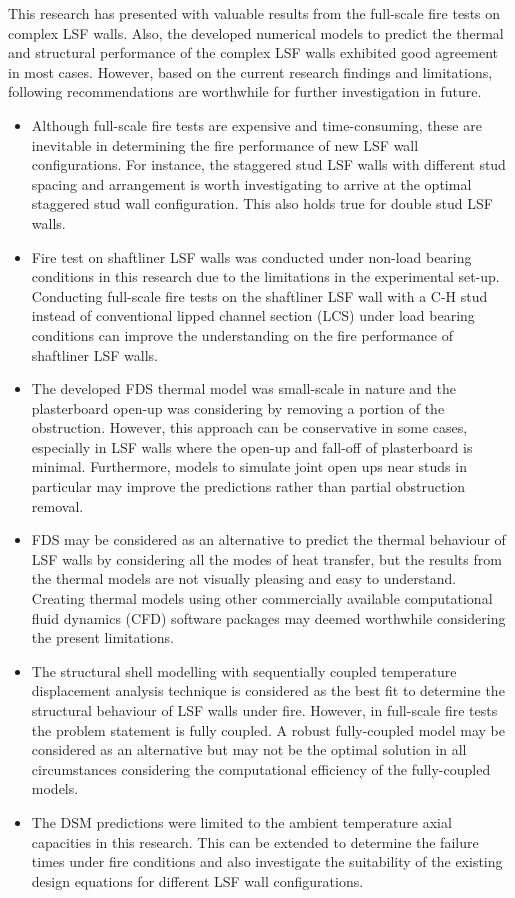 This research has presented with valuable results from the full-scale fire tests on complex LSF walls. Also, the developed numerical models to predict the thermal and structural performance of the complex LSF walls exhibited good agreement in most cases. However, based on the current research findings and limitations, following recommendations are worthwhile for further investigation in future. 
\begin{itemize}
	\item Although full-scale fire tests are expensive and time-consuming, these are inevitable in determining the fire performance of new LSF wall configurations. For instance, the staggered stud LSF walls with different stud spacing and arrangement is worth investigating to arrive at the optimal staggered stud wall configuration. This also holds true for double stud LSF walls.
	\item Fire test on shaftliner LSF walls was conducted under non-load bearing conditions in this research due to the limitations in the experimental set-up. Conducting full-scale fire tests on the shaftliner LSF wall with a C-H stud instead of conventional lipped channel section (LCS) under load bearing conditions can improve the understanding on the fire performance of shaftliner LSF walls.
	\item The developed FDS thermal model was small-scale in nature and the plasterboard open-up was considering by removing a portion of the obstruction. However, this approach can be conservative in some cases, especially in LSF walls where the open-up and fall-off of plasterboard is minimal. Furthermore, models to simulate joint open ups near studs in particular may improve the predictions rather than partial obstruction removal.
	\item FDS may be considered as an alternative to predict the thermal behaviour of LSF walls by considering all the modes of heat transfer, but the results from the thermal models are not visually pleasing and easy to understand. Creating thermal models using other commercially available computational fluid dynamics (CFD) software packages may deemed worthwhile considering the present limitations.
	\item The structural shell modelling with sequentially coupled temperature displacement analysis technique is considered as the best fit to determine the structural behaviour of LSF walls under fire. However, in full-scale fire tests the problem statement is fully coupled. A robust fully-coupled model may be considered as an alternative but may not be the optimal solution in all circumstances considering the computational efficiency of the fully-coupled models. 
	\item The DSM predictions were limited to the ambient temperature axial capacities in this research. This can be extended to determine the failure times under fire conditions and also investigate the suitability of the existing design equations for different LSF wall configurations.
\end{itemize}



